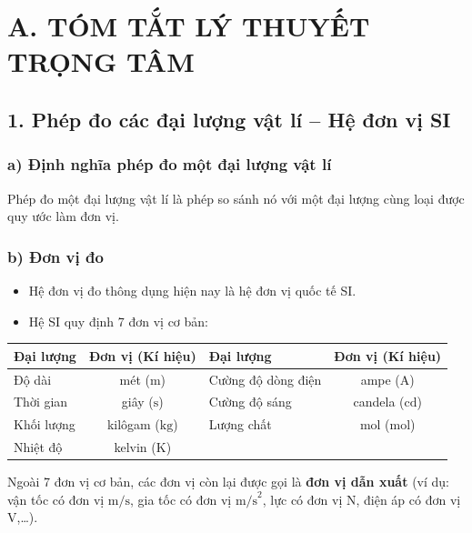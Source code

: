 

\section*{A. TÓM TẮT LÝ THUYẾT TRỌNG TÂM}

\subsection*{1. Phép đo các đại lượng vật lí -- Hệ đơn vị SI}

\subsubsection*{a) Định nghĩa phép đo một đại lượng vật lí}
Phép đo một đại lượng vật lí là phép so sánh nó với một đại lượng cùng loại được quy ước làm đơn vị.

\subsubsection*{b) Đơn vị đo}
\begin{itemize}
    \item Hệ đơn vị đo thông dụng hiện nay là hệ đơn vị quốc tế SI.
    \item Hệ SI quy định 7 đơn vị cơ bản:
\end{itemize}

\begin{center}
\renewcommand{\arraystretch}{1.2}
\begin{tabular}{|l|c||l|c|}
\hline
\textbf{Đại lượng} & \textbf{Đơn vị (Kí hiệu)} & \textbf{Đại lượng} & \textbf{Đơn vị (Kí hiệu)} \\
\hline
Độ dài & mét ($\text{m}$) & Cường độ dòng điện & ampe ($\text{A}$) \\
Thời gian & giây ($\text{s}$) & Cường độ sáng & candela ($\text{cd}$) \\
Khối lượng & kilôgam ($\text{kg}$) & Lượng chất & mol ($\text{mol}$) \\
Nhiệt độ & kelvin ($\text{K}$) & & \\
\hline
\end{tabular}
\end{center}
Ngoài 7 đơn vị cơ bản, các đơn vị còn lại được gọi là \textbf{đơn vị dẫn xuất} (ví dụ: vận tốc có đơn vị $\text{m/s}$, gia tốc có đơn vị $\text{m/s}^2$, lực có đơn vị $\text{N}$, điện áp có đơn vị $\text{V}$,\dots).

